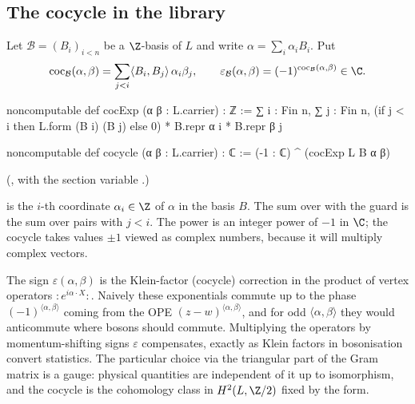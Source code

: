 \subsection{The cocycle in the library}

\begin{definition}\label{ch03:def:cocExp}
Let $\mathcal B=(B_i)_{i<n}$ be a $\Z$-basis of $L$ and write $\alpha=\sum_i\alpha_iB_i$. Put
\begin{equation*}
  \chthreecoc_{\mathcal B}(\alpha,\beta)=\sum_{j<i}\langle B_i,B_j\rangle\,\alpha_i\beta_j,\qquad
  \varepsilon_{\mathcal B}(\alpha,\beta)=(-1)^{\chthreecoc_{\mathcal B}(\alpha,\beta)}\in\C .
\end{equation*}
\end{definition}
\begin{leancode}
noncomputable def cocExp (α β : L.carrier) : ℤ :=
  ∑ i : Fin n, ∑ j : Fin n,
    (if j < i then L.form (B i) (B j) else 0) * B.repr α i * B.repr β j

noncomputable def cocycle (α β : L.carrier) : ℂ := (-1 : ℂ) ^ (cocExp L B α β)
\end{leancode}
(, with the section variable
.)

\begin{dictionary}
 is the $i$-th coordinate $\alpha_i\in\Z$ of $\alpha$ in the basis $B$. The sum
over  with the guard  is the sum over pairs with $j<i$. The power
 is an integer power of $-1$ in $\C$; the cocycle takes values $\pm1$
viewed as complex numbers, because it will multiply complex vectors.
\end{dictionary}

\begin{physics}
The sign $\varepsilon(\alpha,\beta)$ is the Klein-factor (cocycle) correction in the product of vertex operators $:\!e^{i\alpha\cdot X}\!:$. Naively these exponentials commute up to the phase $(-1)^{\langle\alpha,\beta\rangle}$ coming from the OPE $(z-w)^{\langle\alpha,\beta\rangle}$, and for odd $\langle\alpha,\beta\rangle$ they would anticommute where bosons should commute. Multiplying the operators by momentum-shifting signs $\varepsilon$ compensates, exactly as Klein factors in bosonisation convert statistics. The particular choice via the triangular part of the Gram matrix is a gauge: physical quantities are independent of it up to isomorphism, and the cocycle is the cohomology class in $H^2(L,\Z/2)$ fixed by the form.
\end{physics}

